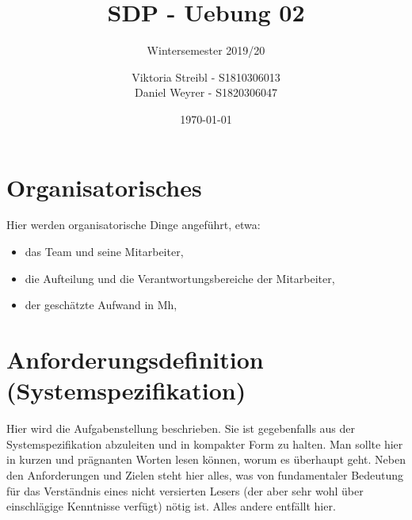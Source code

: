 


\title{SDP - Uebung 02} %
\subtitle{Wintersemester 2019/20} %
\author{
Viktoria Streibl - S1810306013\\
  Daniel Weyrer - S1820306047
} %
\date{\today} %

\maketitle %

\newpage
\tableofcontents %
\newpage


\section{Organisatorisches}

Hier werden organisatorische Dinge angeführt, etwa:
\begin{itemize}
	\item das Team und seine Mitarbeiter,
	\item die Aufteilung und die Verantwortungsbereiche der Mitarbeiter,
	\item der geschätzte Aufwand in Mh,
\end{itemize}




\section{Anforderungsdefinition (Systemspezifikation)}

Hier wird die Aufgabenstellung beschrieben. Sie ist gegebenfalls aus der Systemspezifikation abzuleiten und in kompakter Form zu halten. Man sollte hier in kurzen und
prägnanten Worten lesen können, worum es überhaupt geht. Neben den Anforderungen und Zielen steht hier alles, was von fundamentaler Bedeutung für das Verständnis
eines nicht versierten Lesers (der aber sehr wohl über einschlägige Kenntnisse verfügt) nötig ist. Alles andere entfällt hier.

